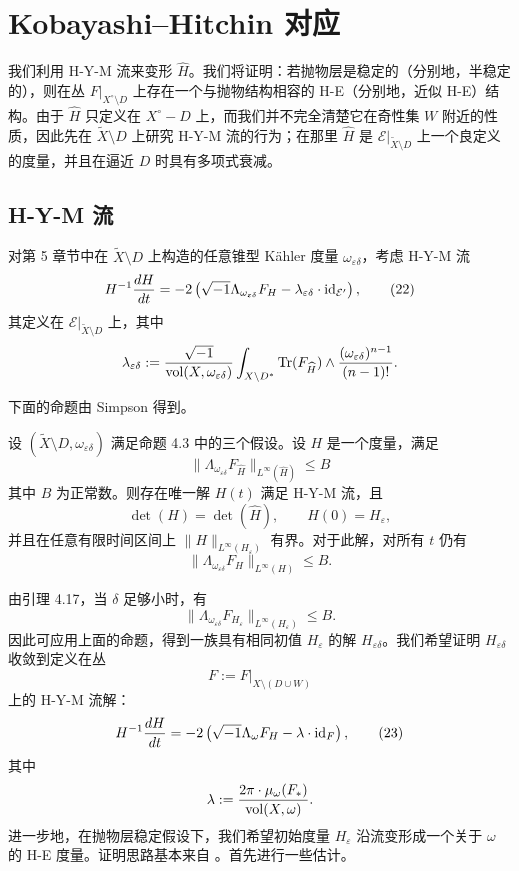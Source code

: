 \chapter{Kobayashi--Hitchin 对应}

我们利用 H-Y-M 流来变形 \(\widehat{H}\)。我们将证明：若抛物层是稳定的（分别地，半稳定的），则在丛 \(F|_{X^\circ\setminus D}\) 上存在一个与抛物结构相容的 H-E（分别地，近似 H-E）结构。由于 \(\widehat{H}\) 只定义在 \(X^\circ-D\) 上，而我们并不完全清楚它在奇性集 \(W\) 附近的性质，因此先在 \(\widetilde X\setminus D\) 上研究 H-Y-M 流的行为；在那里 \(\widehat{H}\) 是 \(\mathcal E|_{\widetilde X\setminus D}\) 上一个良定义的度量，并且在逼近 \(D\) 时具有多项式衰减。

\section{H-Y-M 流}

对第 5 章节中在 \(\widetilde X\setminus D\) 上构造的任意锥型 Kähler 度量 \(\omega_{\varepsilon\delta}\)，考虑 H-Y-M 流
\[
H^{-1}\frac{dH}{dt}
=
-2\left(\sqrt{-1}\Lambda_{\omega_{\varepsilon\delta}}F_H-\lambda_{\varepsilon\delta}\cdot \mathrm{id}_{\mathcal E'}\right), \tag{22}
\] 
其定义在 \(\mathcal E|_{\widetilde X\setminus D}\) 上，其中
\[
\lambda_{\varepsilon\delta}
:=
\frac{\sqrt{-1}}{\operatorname{vol}(X,\omega_{\varepsilon\delta})}
\int_{X\setminus D^*}
\operatorname{Tr}(F_{\widehat{H}})\wedge \frac{(\omega_{\varepsilon\delta})^{n-1}}{(n-1)!}.
\]

下面的命题由 Simpson \cite{Si1} 得到。

\begin{proposition}
设 \((\widetilde X\setminus D,\omega_{\varepsilon\delta})\) 满足命题 4.3 中的三个假设。设 \(H\) 是一个度量，满足
\[
\|\Lambda_{\omega_{\varepsilon\delta}}F_{\widehat{H}}\|_{L^\infty(\widehat{H})}\le B
\]
其中 \(B\) 为正常数。则存在唯一解 \(H(t)\) 满足 H-Y-M 流，且
\[
\det(H)=\det(\widehat{H}),\qquad H(0)=H_{\varepsilon},
\]
并且在任意有限时间区间上 \(\|H\|_{L^\infty(H_{\varepsilon})}\) 有界。对于此解，对所有 \(t\) 仍有
\[
\|\Lambda_{\omega_{\varepsilon\delta}}F_H\|_{L^\infty(H)}\le B.
\]
\end{proposition}

由引理 4.17，当 \(\delta\) 足够小时，有
\[
\|\Lambda_{\omega_{\varepsilon\delta}}F_{H_{\varepsilon}}\|_{L^\infty(H_{\varepsilon})}\le B.
\]
因此可应用上面的命题，得到一族具有相同初值 \(H_{\varepsilon}\) 的解 \(H_{\varepsilon\delta}\)。我们希望证明 \(H_{\varepsilon\delta}\) 收敛到定义在丛
\[
F:=F|_{X\setminus(D\cup W)}
\]
上的 H-Y-M 流解：
\[
H^{-1}\frac{dH}{dt}
=
-2\left(\sqrt{-1}\Lambda_\omega F_H-\lambda\cdot \mathrm{id}_F\right), \tag{23}
\]
其中
\[
\lambda:=\frac{2\pi\cdot \mu_\omega(F_*)}{\operatorname{vol}(X,\omega)}.
\]
进一步地，在抛物层稳定假设下，我们希望初始度量 \(H_{\varepsilon}\) 沿流变形成一个关于 \(\omega\) 的 H-E 度量。证明思路基本来自 \cite{B-S}。首先进行一些估计。

